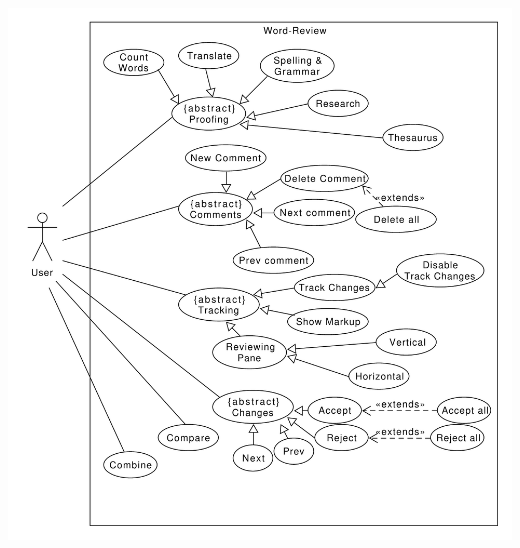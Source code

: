 \documentclass[a4paper, 12pt, margins=2.5cm]{homework}
\begin{document}
\newpage
  
  \begin{problem}
    
  \end{problem}
  \begin{solution}\hfill
    \begin{center}
      \includegraphics[scale=0.6]{Aufgabe5.pdf}
    \end{center}
  \end{solution}
\end{document}
